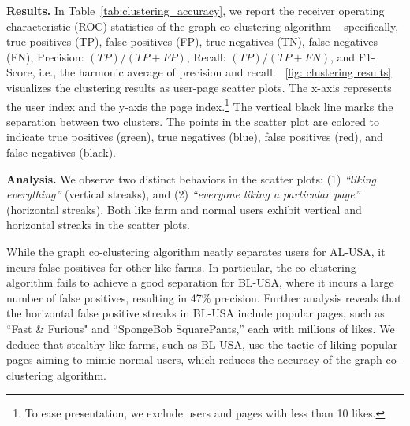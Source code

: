 \documentclass[twocolumn,10pt,letterpaper]{article}
\newcommand{\descr}[1]{\smallskip\noindent\textbf{#1}}
\begin{document}
\descr{Results.} In Table~\ref{tab:clustering_accuracy}, we report the receiver operating characteristic (ROC) statistics of the graph co-clustering algorithm -- specifically, true positives (TP), false positives (FP), true negatives (TN), false negatives (FN), Precision: $(TP)/(TP+FP)$, Recall: $(TP)/(TP+FN)$, and F1-Score, i.e., the harmonic average of precision and recall. \figurename~\ref{fig: clustering results} visualizes the clustering results as user-page scatter plots. The x-axis represents the user index and the y-axis the page index.\footnote{To ease presentation, we exclude users and pages with less than 10 likes.} The vertical black line marks the separation between two clusters. The points in the scatter plot are colored to indicate true positives (green), true negatives (blue), false positives (red), and false negatives (black).


\descr{Analysis.} We observe two distinct behaviors in the scatter plots: (1) {\em ``liking everything''} (vertical streaks), and (2) {\em ``everyone liking a particular page''} (horizontal streaks). Both like farm and normal users exhibit vertical and horizontal streaks in the scatter plots.

While the graph co-clustering algorithm neatly separates users for AL-USA, it incurs false positives for other like farms. In particular, the co-clustering algorithm fails to achieve a good separation for BL-USA, where it incurs a large number of false positives, resulting in 47\% precision. Further analysis reveals that the horizontal false positive streaks in BL-USA include popular pages, such as ``Fast \& Furious" and ``SpongeBob SquarePants,'' each with millions of likes. We deduce that stealthy like farms, such as BL-USA, use the tactic of liking popular pages aiming to mimic normal users, which reduces the accuracy of the graph co-clustering algorithm.
\end{document}
